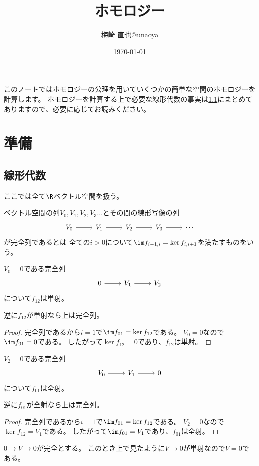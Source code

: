 \documentclass{jsarticle}
\title{ホモロジー}
\author{梅崎 直也@unaoya}
\date{\today}
\begin{document}
\maketitle
このノートではホモロジーの公理を用いていくつかの簡単な空間のホモロジーを計算します。
ホモロジーを計算する上で必要な線形代数の事実は\ref{linalg}にまとめてありますので、必要に応じてお読みください。
\setcounter{tocdepth}{1}
\section{準備}
\subsection{線形代数}\label{linalg}
ここでは全て$\R$ベクトル空間を扱う。
\begin{dfn}[完全列]
ベクトル空間の列$V_0,V_1,V_2,V_3\ldots$とその間の線形写像の列
\[
\begin{tikzcd}
V_0\ar[r] & V_1\ar[r] & V_2 \ar[r] & V_3 \ar[r] & \cdots
\end{tikzcd}
\]
が完全列であるとは
全ての$i>0$について$\im f_{i-1,i}=\ker f_{i,i+1}$を満たすものをいう。
\end{dfn}

\begin{prop}
$V_0=0$である完全列
\[
\begin{tikzcd}
0\ar[r]& V_1\ar[r] & V_2
\end{tikzcd}
\]
について$f_{12}$は単射。

逆に$f_{12}$が単射なら上は完全列。
\end{prop}
\begin{proof}
完全列であるから$i=1$で$\im f_{01}=\ker f_{12}$である。
$V_0=0$なので$\im f_{01}=0$である。
したがって$\ker f_{12}=0$であり、$f_{12}$は単射。
\end{proof}

\begin{prop}
$V_2=0$である完全列
\[
\begin{tikzcd}
V_0\ar[r]& V_1\ar[r] & 0
\end{tikzcd}
\]
について$f_{01}$は全射。

逆に$f_{01}$が全射なら上は完全列。
\end{prop}
\begin{proof}
完全列であるから$i=1$で$\im f_{01}=\ker f_{12}$である。
$V_2=0$なので$\ker f_{12}=V_1$である。
したがって$\im f_{01}=V_1$であり、$f_{01}$は全射。
\end{proof}

\begin{eg}
$0\to V\to 0$が完全とする。
このとき上で見たように$V\to 0$が単射なので$V=0$である。
\end{eg}
\end{document}
